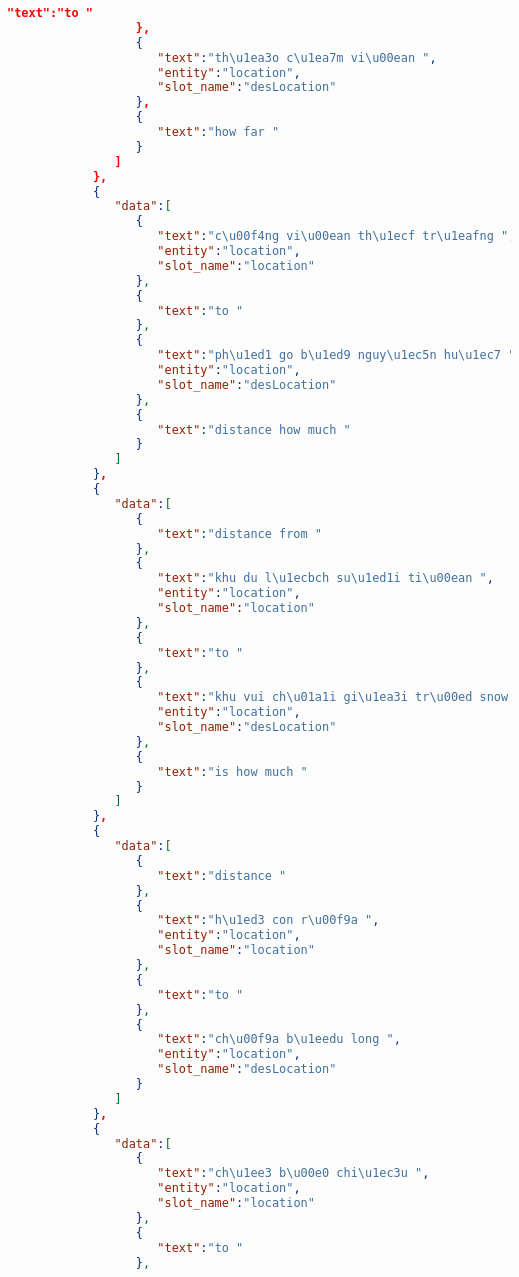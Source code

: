 \begin{lstlisting}[language=json,firstnumber=1]
                     "text":"to "
                  },
                  {
                     "text":"th\u1ea3o c\u1ea7m vi\u00ean ",
                     "entity":"location",
                     "slot_name":"desLocation"
                  },
                  {
                     "text":"how far "
                  }
               ]
            },
            {
               "data":[
                  {
                     "text":"c\u00f4ng vi\u00ean th\u1ecf tr\u1eafng ",
                     "entity":"location",
                     "slot_name":"location"
                  },
                  {
                     "text":"to "
                  },
                  {
                     "text":"ph\u1ed1 go b\u1ed9 nguy\u1ec5n hu\u1ec7 ",
                     "entity":"location",
                     "slot_name":"desLocation"
                  },
                  {
                     "text":"distance how much "
                  }
               ]
            },
            {
               "data":[
                  {
                     "text":"distance from "
                  },
                  {
                     "text":"khu du l\u1ecbch su\u1ed1i ti\u00ean ",
                     "entity":"location",
                     "slot_name":"location"
                  },
                  {
                     "text":"to "
                  },
                  {
                     "text":"khu vui ch\u01a1i gi\u1ea3i tr\u00ed snow town ",
                     "entity":"location",
                     "slot_name":"desLocation"
                  },
                  {
                     "text":"is how much "
                  }
               ]
            },
            {
               "data":[
                  {
                     "text":"distance "
                  },
                  {
                     "text":"h\u1ed3 con r\u00f9a ",
                     "entity":"location",
                     "slot_name":"location"
                  },
                  {
                     "text":"to "
                  },
                  {
                     "text":"ch\u00f9a b\u1eedu long ",
                     "entity":"location",
                     "slot_name":"desLocation"
                  }
               ]
            },
            {
               "data":[
                  {
                     "text":"ch\u1ee3 b\u00e0 chi\u1ec3u ",
                     "entity":"location",
                     "slot_name":"location"
                  },
                  {
                     "text":"to "
                  },

\end{lstlisting}
